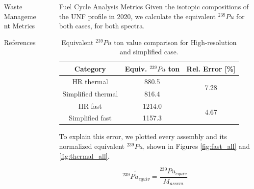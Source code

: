 \documentclass[final]{beamer}
\newlength{\sepwid}
\newlength{\onecolwid}
\newlength{\threecolwid}
\begin{document}
\begin{frame}[t]
\begin{columns}[t,totalwidth=\threecolwid]
\begin{column}{\onecolwid}
\begin{block}{Waste Management Metrics}
\end{block}


\begin{block}{References}

        {\footnotesize 
        }
\end{block}

\end{column} %

\begin{column}{\sepwid}\end{column} %



\begin{column}{\onecolwid} %


\begin{block}{Fuel Cycle Analysis Metrics}
Given the isotopic compositions of the \gls{UNF} profile in 2020,
we calculate the equivalent $^{239}Pu$ for both cases, for
both spectra.

\begin{table}[h]
    \centering
    \begin{tabular}{ccc}
        \hline
        Category & Equiv. $^{239}Pu$ ton & Rel. Error [\%] \\
        \hline
        HR thermal & 880.5 & \multirow{2}{*}{7.28}\\
        Simplified thermal & 816.4\\
        \hline
        HR fast & 1214.0 & \multirow{2}{*}{4.67}\\
        Simplified fast & 1157.3 &\\
        \hline
    \end{tabular}
    \caption{Equivalent $^{239}Pu$ ton value comparison for High-resolution and simplified case.}
    \label{tab:equiv}
\end{table}


To explain this error, we plotted every assembly and its
normalized equivalent $^{239}Pu$, shown in Figures \ref{fig:fast_all} and \ref{fig:thermal_all}.

\[ \widetilde{^{239}Pu_{equiv}} = \frac{^{239}Pu_{equiv}}{M_{assem}}\]


\end{block}
\end{column}
\end{columns}
\end{frame}
\end{document}
